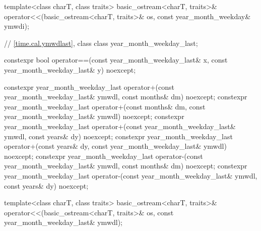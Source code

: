 \begin{codeblock}
{{    template<class charT, class traits>
      basic_ostream<charT, traits>&
        operator<<(basic_ostream<charT, traits>& os, const year_month_weekday& ymwdi);

    // \ref{time.cal.ymwdlast}, class 
    class year_month_weekday_last;

    constexpr bool operator==(const year_month_weekday_last& x,
                              const year_month_weekday_last& y) noexcept;

    constexpr year_month_weekday_last
      operator+(const year_month_weekday_last& ymwdl, const months& dm) noexcept;
    constexpr year_month_weekday_last
      operator+(const months& dm, const year_month_weekday_last& ymwdl) noexcept;
    constexpr year_month_weekday_last
      operator+(const year_month_weekday_last& ymwdl, const years& dy) noexcept;
    constexpr year_month_weekday_last
      operator+(const years& dy, const year_month_weekday_last& ymwdl) noexcept;
    constexpr year_month_weekday_last
      operator-(const year_month_weekday_last& ymwdl, const months& dm) noexcept;
    constexpr year_month_weekday_last
      operator-(const year_month_weekday_last& ymwdl, const years& dy) noexcept;

    template<class charT, class traits>
      basic_ostream<charT, traits>&
        operator<<(basic_ostream<charT, traits>& os, const year_month_weekday_last& ymwdl);

}}
\end{codeblock}

